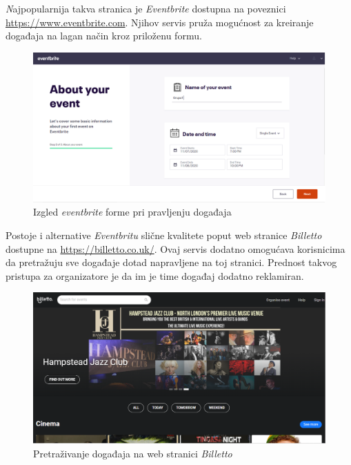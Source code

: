 		\textit Najpopularnija takva stranica je \textit{Eventbrite} dostupna na poveznici \url{https://www.eventbrite.com}. Njihov servis pruža mogućnost za kreiranje događaja na lagan način kroz priloženu formu. \\
		
		\begin{figure}[H]
			\includegraphics[width=.9\linewidth]{slike/eventbrite.png} %
			\centering
			\caption{Izgled \textit{eventbrite} forme pri pravljenju događaja}
			\label{fig:eventbrite} %
		\end{figure}
		
		Postoje i alternative \textit{Eventbritu} slične kvalitete poput web stranice \textit{Billetto} dostupne na \url{https://billetto.co.uk/}. Ovaj servis dodatno omogućava korisnicima da pretražuju sve događaje dotad napravljene na toj stranici. Prednost takvog pristupa za organizatore je da im je time događaj dodatno reklamiran.
		
		\begin{figure}[H]
			\includegraphics[width=.9\linewidth]{slike/billetto.png} %
			\centering
			\caption{Pretraživanje događaja na web stranici \textit{Billetto}}
			\label{fig:Billetto} %
		\end{figure}
	
